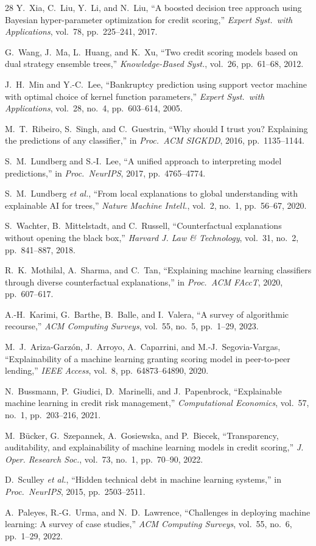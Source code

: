 \documentclass[conference]{IEEEtran}
\begin{document}
\begin{thebibliography}{28}
 Y.~Xia, C.~Liu, Y.~Li, and N.~Liu, ``A boosted decision tree approach using Bayesian hyper-parameter optimization for credit scoring,'' \textit{Expert Syst.\ with Applications}, vol.~78, pp.~225--241, 2017.

 G.~Wang, J.~Ma, L.~Huang, and K.~Xu, ``Two credit scoring models based on dual strategy ensemble trees,'' \textit{Knowledge-Based Syst.}, vol.~26, pp.~61--68, 2012.

 J.~H.~Min and Y.-C.~Lee, ``Bankruptcy prediction using support vector machine with optimal choice of kernel function parameters,'' \textit{Expert Syst.\ with Applications}, vol.~28, no.~4, pp.~603--614, 2005.

 M.~T.~Ribeiro, S.~Singh, and C.~Guestrin, ``Why should I trust you? Explaining the predictions of any classifier,'' in \textit{Proc.\ ACM SIGKDD}, 2016, pp.~1135--1144.

 S.~M.~Lundberg and S.-I.~Lee, ``A unified approach to interpreting model predictions,'' in \textit{Proc.\ NeurIPS}, 2017, pp.~4765--4774.

 S.~M.~Lundberg \textit{et al.}, ``From local explanations to global understanding with explainable AI for trees,'' \textit{Nature Machine Intell.}, vol.~2, no.~1, pp.~56--67, 2020.

 S.~Wachter, B.~Mittelstadt, and C.~Russell, ``Counterfactual explanations without opening the black box,'' \textit{Harvard J. Law \& Technology}, vol.~31, no.~2, pp.~841--887, 2018.

 R.~K.~Mothilal, A.~Sharma, and C.~Tan, ``Explaining machine learning classifiers through diverse counterfactual explanations,'' in \textit{Proc.\ ACM FAccT}, 2020, pp.~607--617.

 A.-H.~Karimi, G.~Barthe, B.~Balle, and I.~Valera, ``A survey of algorithmic recourse,'' \textit{ACM Computing Surveys}, vol.~55, no.~5, pp.~1--29, 2023.

 M.~J.~Ariza-Garz\'{o}n, J.~Arroyo, A.~Caparrini, and M.-J.~Segovia-Vargas, ``Explainability of a machine learning granting scoring model in peer-to-peer lending,'' \textit{IEEE Access}, vol.~8, pp.~64873--64890, 2020.

 N.~Bussmann, P.~Giudici, D.~Marinelli, and J.~Papenbrock, ``Explainable machine learning in credit risk management,'' \textit{Computational Economics}, vol.~57, no.~1, pp.~203--216, 2021.

 M.~B\"{u}cker, G.~Szepannek, A.~Gosiewska, and P.~Biecek, ``Transparency, auditability, and explainability of machine learning models in credit scoring,'' \textit{J. Oper. Research Soc.}, vol.~73, no.~1, pp.~70--90, 2022.

 D.~Sculley \textit{et al.}, ``Hidden technical debt in machine learning systems,'' in \textit{Proc.\ NeurIPS}, 2015, pp.~2503--2511.

 A.~Paleyes, R.-G.~Urma, and N.~D.~Lawrence, ``Challenges in deploying machine learning: A survey of case studies,'' \textit{ACM Computing Surveys}, vol.~55, no.~6, pp.~1--29, 2022.

\end{thebibliography}
\end{document}
